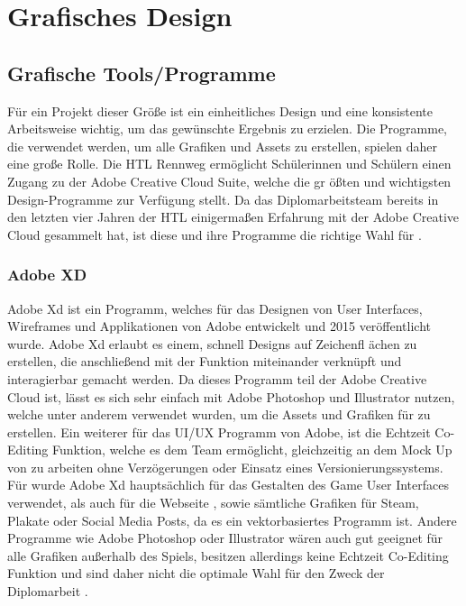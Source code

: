 
\chapter{Grafisches Design}\label{ch:grafikdesign}

\section{Grafische Tools/Programme}

Für ein Projekt dieser Größe
ist ein einheitliches Design und eine konsistente Arbeitsweise wichtig, um das gewünschte Ergebnis zu erzielen.
Die Programme, die verwendet werden, um alle Grafiken und Assets zu erstellen, spielen daher eine große Rolle.
Die HTL Rennweg ermöglicht Schülerinnen und Schülern einen Zugang zu der Adobe Creative Cloud Suite, welche die gr
ößten und wichtigsten Design-Programme zur Verfügung stellt. Da das Diplomarbeitsteam bereits in den letzten vier Jahren der HTL einigermaßen Erfahrung mit der Adobe Creative Cloud gesammelt hat, ist diese und ihre Programme die richtige Wahl für \FF.

\subsection{Adobe XD}

Adobe Xd ist ein Programm, welches für das Designen von User Interfaces, Wireframes und Applikationen von Adobe
entwickelt und 2015 veröffentlicht wurde.  Adobe Xd erlaubt es einem, schnell Designs auf Zeichenfl
ächen zu
erstellen,
die anschließend mit der  Funktion miteinander verknüpft und interagierbar gemacht werden.
Da dieses Programm teil der Adobe Creative Cloud ist, lässt es sich sehr einfach mit Adobe Photoshop und Illustrator nutzen, welche unter anderem verwendet wurden, um die Assets und Grafiken für \FF zu erstellen. Ein weiterer
für das UI/UX Programm von Adobe, ist die Echtzeit Co-Editing Funktion, welche es dem Team ermöglicht, gleichzeitig an dem Mock Up von \FF zu arbeiten ohne Verzögerungen oder Einsatz eines Versionierungssystems.
Für \FF wurde Adobe Xd hauptsächlich für das Gestalten des Game User Interfaces verwendet, als auch für die Webseite
, sowie sämtliche Grafiken für Steam, Plakate oder Social Media Posts, da es ein vektorbasiertes Programm ist. Andere
Programme wie Adobe Photoshop oder Illustrator wären auch gut geeignet für alle Grafiken außerhalb des Spiels,
besitzen allerdings keine Echtzeit Co-Editing Funktion und sind daher nicht die optimale Wahl für den Zweck der
Diplomarbeit .


